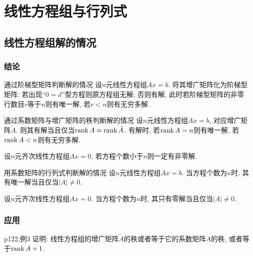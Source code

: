 \chapter{线性方程组与行列式}

\section{线性方程组解的情况}

\subsection*{结论}

\begin{theorem}{通过阶梯型矩阵判断解的情况}
	设$n$元线性方程组$Ax=b$. 将其增广矩阵化为阶梯型矩阵: 若出现“$0=d$”型方程则原方程组无解; 否则有解, 此时若阶梯型矩阵的非零行数目$r$等于$n$则有唯一解, 若$r<n$则有无穷多解. 
\end{theorem}

\begin{theorem}{通过系数矩阵与增广矩阵的秩判断解的情况}
	设$n$元线性方程组$Ax=b$, 对应增广矩阵$\tilde{A}$. 则其有解当且仅当$\operatorname{rank} A = \operatorname{rank} \tilde{A}$. 有解时, 若$\operatorname{rank} A = n$则有唯一解, 若$\operatorname{rank} A < n$则有无穷多解. 
\end{theorem}

\begin{corollary}{}
	设$n$元齐次线性方程组$Ax=0$, 若方程个数小于$n$则一定有非零解. 
\end{corollary}

\begin{theorem}{用系数矩阵的行列式判断解的情况}
	设$n$元线性方程组$Ax=b$. 当方程个数为$n$时, 其有唯一解当且仅当$|A| \neq 0$. 
\end{theorem}

\begin{corollary}{}
	设$n$元齐次线性方程组$Ax=0$. 当方程个数为$n$时, 其只有零解当且仅当$|A| \neq 0$. 
\end{corollary}

\subsection*{应用}

\begin{example}{p122,例3}
	证明: 线性方程组的增广矩阵$\tilde{A}$的秩或者等于它的系数矩阵$A$的秩, 或者等于$\operatorname{rank} A +1$. 
\end{example}

